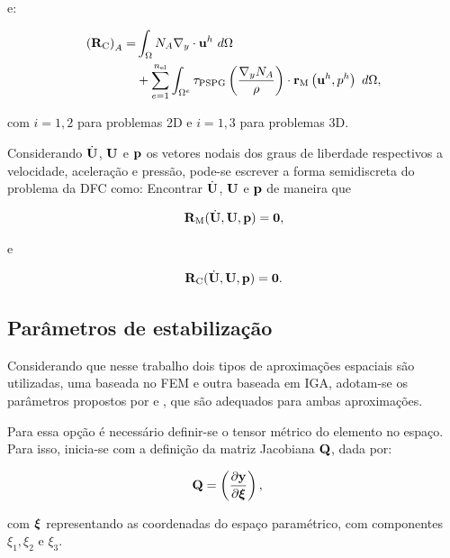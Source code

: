\documentclass[tese_patricia]{subfiles}%
\begin{document}
\noindent e:

\begin{align}
	\begin{split}
	\left(\mathbf{R}_\mathrm{C}\right)_{A} = &\int_{\Omega} N_A \nabla_y \cdot \mathbf{u}^h \ d\Omega \\ 
	&+ \sum_{e=1}^{n_{\mathrm{el}}} \int_{\Omega^e} \tau_{\mathrm{PSPG}} \left(\frac{\nabla_y N_A}{\rho}\right) \cdot \mathbf{r}_{\mathrm{M}}\left(\mathbf{u}^h,p^h\right) \  d\Omega,
	\end{split}
\end{align}

\noindent com $i=1,2$ para problemas 2D e $i=1,3$ para problemas 3D.
		
Considerando $\dot{\mathbf{U}}$, $\mathbf{U}$ e $\mathbf{p}$ os vetores nodais dos graus de liberdade respectivos a velocidade, aceleração e pressão, pode-se escrever a forma semidiscreta do problema da DFC como: Encontrar $\dot{\mathbf{U}}$, $\mathbf{U}$ e $\mathbf{p}$ de maneira que

\begin{align}
\mathbf{R}_\mathrm{M}(\dot{\mathbf{U}},\mathbf{U},\mathbf{p}) = \mathbf{0},\label{eq:momentum_residual}
\end{align}

\noindent e

\begin{align}
\mathbf{R}_\mathrm{C}(\dot{\mathbf{U}},\mathbf{U},\mathbf{p}) = \mathbf{0}. \label{eq:continuity_residual}
\end{align}




\subsection{Parâmetros de estabilização}\label{subsec:taus}

Considerando que nesse trabalho dois tipos de aproximações espaciais são utilizadas, uma baseada no FEM e outra baseada em IGA, adotam-se os parâmetros propostos por  e , que são adequados para ambas aproximações. 

Para essa opção é necessário definir-se o tensor métrico do elemento no espaço. Para isso, inicia-se com a definição da matriz Jacobiana $\mathbf{Q}$, dada por:

\begin{align}
	\mathbf{Q}&=\left(\frac{\partial\mathbf{y}}{\partial\bm{\xi}}\right),
\end{align}

\noindent com $\bm{\xi}$ representando as coordenadas do espaço paramétrico, com componentes $\xi_1, \xi_2$ e $\xi_3$.
\end{document}
